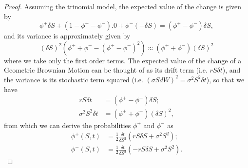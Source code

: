 \begin{proof}
Assuming the trinomial model, the expected value of the change is given by
\begin{equation}
\phi^+\delta S+(1-\phi^+-\phi^-).0+\phi^-(-\delta S)=(\phi^+-\phi^-)\delta S,
\end{equation}
\noindent and its variance is approximately given by
\begin{equation}
(\delta S)^2(\phi^++\phi^--(\phi^+-\phi^-)^2)\approx (\phi^++\phi^-)(\delta S)^2
\end{equation}
\noindent where we take only the first order terms. The expected value of the change of a Geometric Brownian Motion can be thought of as its drift term (i.e. $rS\delta t$), and the variance is its stochastic term squared (i.e. $(\sigma SdW)^2=\sigma^2S^2\delta t$), so that we have
\begin{subequations}
\begin{align}
rS\delta t&=(\phi^+-\phi^-)\delta S;\\
\sigma^2S^2\delta t&=(\phi^++\phi^-)(\delta S)^2,
\end{align}
\end{subequations}
\noindent from which we can derive the probabilities $\phi^+$ and $\phi^-$ as
\begin{subequations}
\begin{align}
\phi^+(S,t)&=\frac{1}{2}\frac{\delta t}{\delta S^2}(rS\delta S+\sigma^2S^2);\\
\phi^-(S,t)&=\frac{1}{2}\frac{\delta t}{\delta S^2}(-rS\delta S+\sigma^2S^2).
\end{align}
\end{subequations}


\end{proof}

